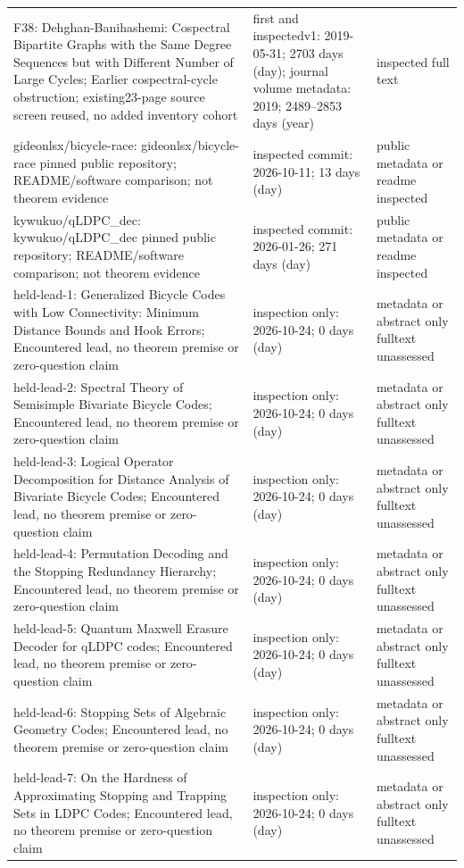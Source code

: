 {\begin{longtable}{@{}>{\raggedright\arraybackslash}p{.27\linewidth}>{\raggedright\arraybackslash}p{.47\linewidth}>{\raggedright\arraybackslash}p{.18\linewidth}@{}}
F38: Dehghan-Banihashemi: Cospectral Bipartite Graphs with the Same Degree Sequences but with Different Number of Large Cycles; Earlier cospectral-cycle obstruction; existing23-page source screen reused, no added inventory cohort & first and inspectedv1: 2019-05-31; 2703 days (day); journal volume metadata: 2019; 2489--2853 days (year) & inspected full text\\[4pt]
gideonlsx/bicycle-race: gideonlsx/bicycle-race pinned public repository; README/software comparison; not theorem evidence & inspected commit: 2026-10-11; 13 days (day) & public metadata or readme inspected\\[4pt]
kywukuo/qLDPC\_dec: kywukuo/qLDPC\_dec pinned public repository; README/software comparison; not theorem evidence & inspected commit: 2026-01-26; 271 days (day) & public metadata or readme inspected\\[4pt]
held-lead-1: Generalized Bicycle Codes with Low Connectivity: Minimum Distance Bounds and Hook Errors; Encountered lead, no theorem premise or zero-question claim & inspection only: 2026-10-24; 0 days (day) & metadata or abstract only fulltext unassessed\\[4pt]
held-lead-2: Spectral Theory of Semisimple Bivariate Bicycle Codes; Encountered lead, no theorem premise or zero-question claim & inspection only: 2026-10-24; 0 days (day) & metadata or abstract only fulltext unassessed\\[4pt]
held-lead-3: Logical Operator Decomposition for Distance Analysis of Bivariate Bicycle Codes; Encountered lead, no theorem premise or zero-question claim & inspection only: 2026-10-24; 0 days (day) & metadata or abstract only fulltext unassessed\\[4pt]
held-lead-4: Permutation Decoding and the Stopping Redundancy Hierarchy; Encountered lead, no theorem premise or zero-question claim & inspection only: 2026-10-24; 0 days (day) & metadata or abstract only fulltext unassessed\\[4pt]
held-lead-5: Quantum Maxwell Erasure Decoder for qLDPC codes; Encountered lead, no theorem premise or zero-question claim & inspection only: 2026-10-24; 0 days (day) & metadata or abstract only fulltext unassessed\\[4pt]
held-lead-6: Stopping Sets of Algebraic Geometry Codes; Encountered lead, no theorem premise or zero-question claim & inspection only: 2026-10-24; 0 days (day) & metadata or abstract only fulltext unassessed\\[4pt]
held-lead-7: On the Hardness of Approximating Stopping and Trapping Sets in LDPC Codes; Encountered lead, no theorem premise or zero-question claim & inspection only: 2026-10-24; 0 days (day) & metadata or abstract only fulltext unassessed\\[4pt]

\end{longtable}}

